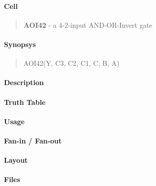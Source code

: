 \label{AOI42}
\paragraph{Cell}
\begin{quote}
    \textbf{AOI42} - a 4-2-input AND-OR-Invert gate
\end{quote}

\paragraph{Synopsys}
\begin{quote}
    AOI42(Y, C3, C2, C1, C, B, A)
\end{quote}

\paragraph{Description}

%

\paragraph{Truth Table}
%

\paragraph{Usage}

\paragraph{Fan-in / Fan-out}

\paragraph{Layout}

\paragraph{Files}
